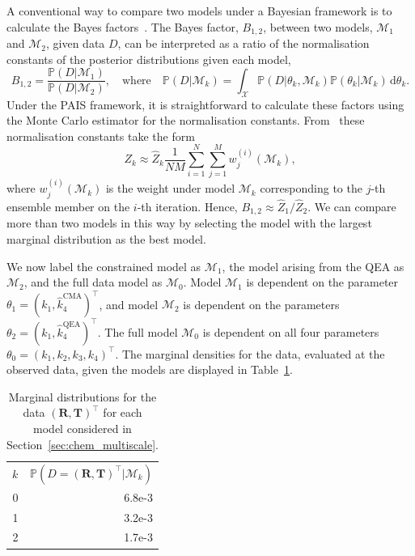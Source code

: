 \documentclass[final]{siamltex}
\begin{document}
A conventional way to compare two models under a Bayesian framework is
to calculate the Bayes factors~\cite{chen2012monte}. The Bayes factor,
$B_{1,2}$, between two models, $\mathcal{M}_1$ and $\mathcal{M}_2$,
given data $D$, can be interpreted as a ratio of the normalisation constants of the posterior distributions given each model,
\[
	B_{1,2} = \frac{\mathbb{P}(D|\mathcal{M}_1)}{\mathbb{P}(D|\mathcal{M}_2)}, \quad \text{where} \quad \mathbb{P}(D|\mathcal{M}_k) = \int_\mathcal{X} \mathbb{P}(D|\theta_k,\mathcal{M}_k)\mathbb{P}(\theta_k|\mathcal{M}_k) \, \text{d}\theta_k.
\]
Under the PAIS framework, it is straightforward to calculate these factors using the Monte Carlo estimator for the normalisation constants. From~\cite{robert2013monte} these normalisation constants take the form
\[
	Z_k \approx \hat{Z}_k\frac{1}{NM}\sum_{i=1}^N\sum_{j=1}^M w_j^{(i)}(\mathcal{M}_k),
\]
where $w_j^{(i)}(\mathcal{M}_k)$ is the weight under model $\mathcal{M}_k$ corresponding to the $j$-th ensemble member on the $i$-th iteration. Hence, $B_{1,2} \approx \hat{Z}_1/\hat{Z}_2$. We can compare more than two models in this way by selecting the model with the largest marginal distribution as the best model.

We now label the constrained model as $\mathcal{M}_1$, the model
arising from the QEA as $\mathcal{M}_2$, and the full data model as
$\mathcal{M}_0$. Model $\mathcal{M}_1$ is dependent on the parameter
$\theta_1 = (k_1, \hat{k}_4^{\text{CMA}})^\top$, and model
$\mathcal{M}_2$ is dependent on the parameters $\theta_2 = (k_1,
\hat{k}_4^{\text{QEA}})^\top$. The full model $\mathcal{M}_0$ is
dependent on all four parameters $\theta_0 = (k_1, k_2, k_3, k_4)^\top$. The marginal densities for the data, evaluated at the observed data, given the models are displayed in Table~\ref{tab:chem_Bayes_marginals}.

\begin{table}[!htb]
\centering
\begin{tabular}{rr}
	\toprule
	$k$ & \quad $\mathbb{P}(D = (\mathbf{R},\mathbf{T})^\top|\mathcal{M}_k)$ \\ \cmidrule(lr){1-2}
	0 & 6.8e-3 \\
	1 & 3.2e-3 \\
	2 & 1.7e-3 \\ \bottomrule
\end{tabular}
\caption{Marginal distributions for the data $(\mathbf{R},\mathbf{T})^\top$ for each model considered in Section~\ref{sec:chem_multiscale}.}
\label{tab:chem_Bayes_marginals}
\end{table}
\end{document}
